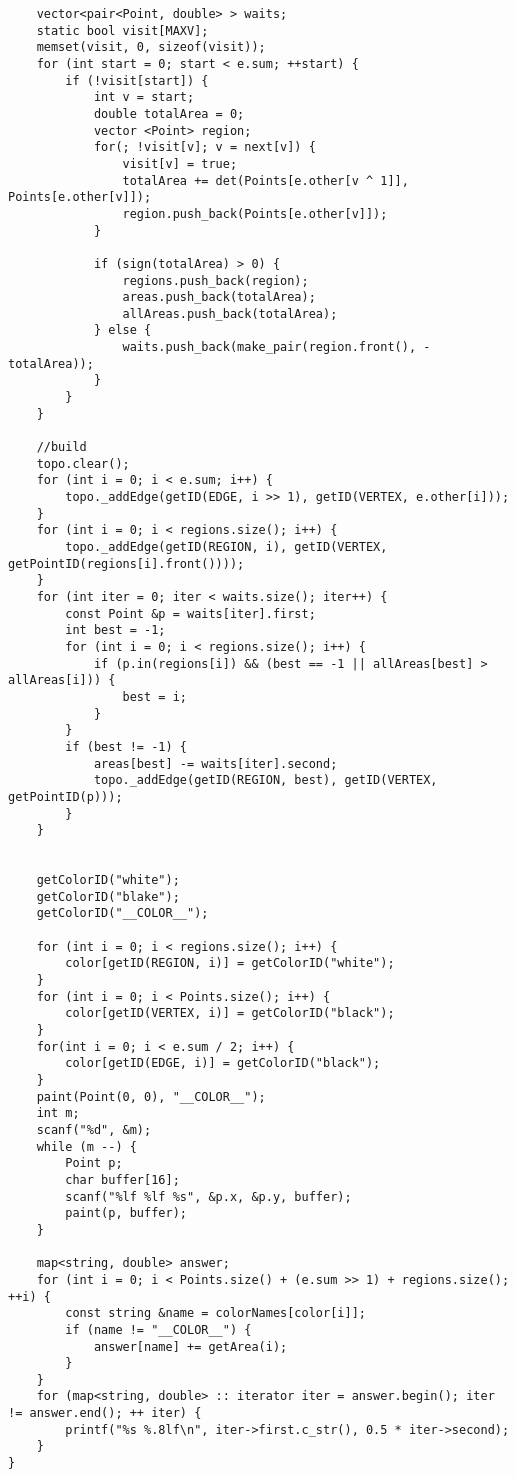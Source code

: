 \begin{lstlisting}
	vector<pair<Point, double> > waits;
	static bool visit[MAXV];
	memset(visit, 0, sizeof(visit));
	for (int start = 0; start < e.sum; ++start) {
		if (!visit[start]) {
			int v = start;
			double totalArea = 0;
			vector <Point> region;
			for(; !visit[v]; v = next[v]) {
				visit[v] = true;
				totalArea += det(Points[e.other[v ^ 1]], Points[e.other[v]]);
				region.push_back(Points[e.other[v]]);
			}
			
			if (sign(totalArea) > 0) {
				regions.push_back(region);
				areas.push_back(totalArea);
				allAreas.push_back(totalArea);
			} else {
				waits.push_back(make_pair(region.front(), -totalArea));
			}
		}
	}
	
	//build
	topo.clear();
	for (int i = 0; i < e.sum; i++) {
		topo._addEdge(getID(EDGE, i >> 1), getID(VERTEX, e.other[i]));
	}
	for (int i = 0; i < regions.size(); i++) {
		topo._addEdge(getID(REGION, i), getID(VERTEX, getPointID(regions[i].front())));
	}
	for (int iter = 0; iter < waits.size(); iter++) {
		const Point &p = waits[iter].first;
		int best = -1;
		for (int i = 0; i < regions.size(); i++) {
			if (p.in(regions[i]) && (best == -1 || allAreas[best] > allAreas[i])) {
				best = i;
			}
		}
		if (best != -1) {
			areas[best] -= waits[iter].second;
			topo._addEdge(getID(REGION, best), getID(VERTEX, getPointID(p)));
		}
	}
	
	
	getColorID("white");
	getColorID("blake");
	getColorID("__COLOR__");
	
	for (int i = 0; i < regions.size(); i++) {
		color[getID(REGION, i)] = getColorID("white");
	}
	for (int i = 0; i < Points.size(); i++) {
		color[getID(VERTEX, i)] = getColorID("black");
	}
	for(int i = 0; i < e.sum / 2; i++) {
		color[getID(EDGE, i)] = getColorID("black");
	}
	paint(Point(0, 0), "__COLOR__");
	int m;
	scanf("%d", &m);
	while (m --) {
		Point p;
		char buffer[16];
		scanf("%lf %lf %s", &p.x, &p.y, buffer);
		paint(p, buffer);
	}
	
	map<string, double> answer;
	for (int i = 0; i < Points.size() + (e.sum >> 1) + regions.size(); ++i) {
		const string &name = colorNames[color[i]];
		if (name != "__COLOR__") {
			answer[name] += getArea(i);
		}
	}
	for (map<string, double> :: iterator iter = answer.begin(); iter != answer.end(); ++ iter) {
		printf("%s %.8lf\n", iter->first.c_str(), 0.5 * iter->second);
	}
}
	\end{lstlisting}
